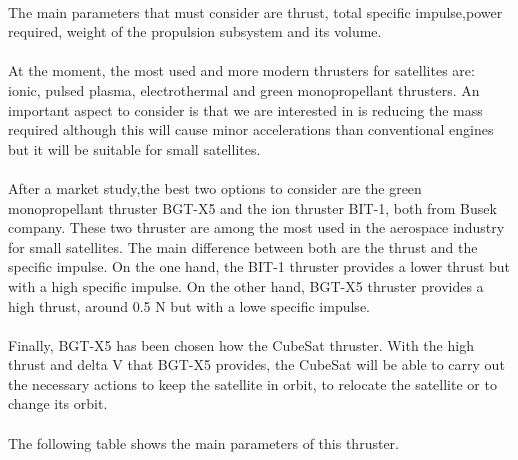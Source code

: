 \paragraph{}
The main parameters that must consider are thrust, total specific impulse,power required, weight of the  propulsion subsystem and its volume.

\paragraph{}
At the moment, the most used and more modern thrusters for satellites are: ionic, pulsed plasma, electrothermal and green monopropellant thrusters. An important aspect to consider is that we are interested in is reducing the mass required although this will cause minor accelerations than conventional engines but it will be suitable for small satellites.

\paragraph{}
After a market study,the best two options to consider are the green monopropellant thruster BGT-X5 and the ion thruster BIT-1, both from Busek company. These two thruster are among the most used in the aerospace industry for small satellites. The main difference between both are the thrust and the specific impulse. On the one hand, the BIT-1 thruster provides a lower thrust but with a high specific impulse. On the other hand, BGT-X5 thruster provides a high thrust, around 0.5 N but with a lowe specific impulse.

\paragraph{}
Finally, BGT-X5 has been chosen how the CubeSat thruster. With the high thrust and delta V that BGT-X5 provides, the CubeSat will be able to carry out the necessary actions to keep the satellite in orbit, to relocate the satellite or to change its orbit.


\paragraph{}
The following table shows the main parameters of this thruster.


